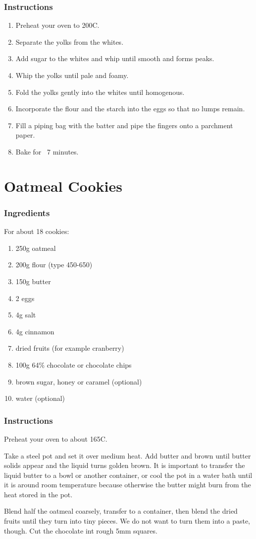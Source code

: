 \documentclass[11pt]{report}
\newcommand{\header}[1]{\subsubsection*{#1}}
\begin{document}
\header{Instructions}
\begin{enumerate}
  \item Preheat your oven to 200C.
  \item Separate the yolks from the whites.
  \item Add sugar to the whites and whip until smooth and forms peaks.
  \item Whip the yolks until pale and foamy.
  \item Fold the yolks gently into the whites until homogenous.
  \item Incorporate the flour and the starch into the eggs so that no lumps
    remain.
  \item Fill a piping bag with the batter and pipe the fingers onto a parchment
    paper.
  \item Bake for ~7 minutes.
\end{enumerate}

\section{Oatmeal Cookies}
\header{Ingredients}
For about 18 cookies:
\begin{enumerate}
  \item 250g oatmeal
  \item 200g flour (type 450-650)
  \item 150g butter
  \item 2 eggs
  \item 4g salt
  \item 4g cinnamon
  \item dried fruits (for example cranberry)
  \item 100g 64\% chocolate or chocolate chips
  \item brown sugar, honey or caramel (optional)
  \item water (optional)
\end{enumerate}

\header{Instructions}
Preheat your oven to about 165C.

Take a steel pot and set it over medium heat. Add butter and brown until butter
solids appear and the liquid turns golden brown. It is important to transfer
the liquid butter to a bowl or another container, or cool the pot in a water
bath until it is around room temperature because otherwise the butter might
burn from the heat stored in the pot.

Blend half the oatmeal coarsely, transfer to a container, then blend the dried
fruits until they turn into tiny pieces. We do not want to turn them into a
paste, though. Cut the chocolate int rough 5mm squares.
\end{document}
